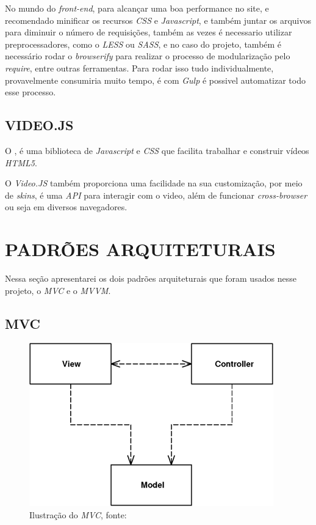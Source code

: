 No mundo do \textit{front-end}, para alcançar uma boa performance no site, e recomendado minificar os recursos \textit{CSS} e \textit{Javascript}, e também juntar os arquivos para diminuir o número de requisições, também as vezes é necessario utilizar preprocessadores, como o \textit{LESS} ou \textit{SASS}, e no caso do projeto, também é necessário rodar o \textit{browserify} para realizar o processo de modularização pelo \textit{require}, entre outras ferramentas. Para rodar isso tudo individualmente, provavelmente consumiria muito tempo, é com \textit{Gulp} é possivel automatizar todo esse processo.

\subsection{VIDEO.JS}
O , é uma biblioteca de \textit{Javascript} e \textit{CSS} que facilita trabalhar e construir vídeos \textit{HTML5}.

O \textit{Video.JS} também proporciona uma facilidade na sua customização, por meio de \textit{skins}, é uma \textit{API} para interagir com o video, além de funcionar \textit{cross-browser} ou seja em diversos navegadores.

\newpage
\section{PADRÕES ARQUITETURAIS}
Nessa seção apresentarei os dois padrões arquiteturais que foram usados nesse projeto, o \textit{MVC} e o \textit{MVVM}.

\subsection{MVC}
    \begin{figure}[h]
        \centering
        \label{fig:mvc-fowler}
        \includegraphics[keepaspectratio=true,scale=0.7]{figuras/mvc-fowler.png}
        \caption{Ilustração do \textit{MVC}, fonte: \cite{martin_fowler_patterns}}
    \end{figure}

